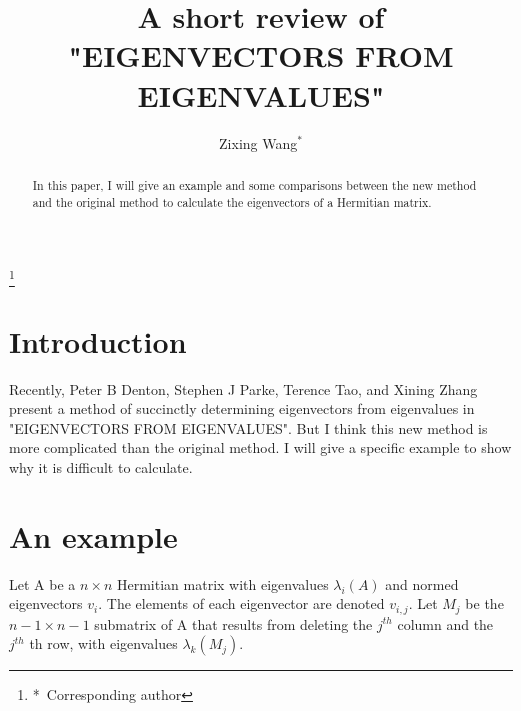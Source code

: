 \documentclass{amsart}
\theoremstyle{definition}
\theoremstyle{remark}
\numberwithin{equation}{section}
\begin{document}
	
	\title{A short review of "EIGENVECTORS FROM EIGENVALUES"}
	\date{}


\author{Zixing Wang$^*$}


\address{School of Mathematical Sciences, Shanghai Jiao Tong University,
800 Dongchuan Road, 200240 Shanghai, China}

\thanks{ *\ Corresponding author}



\date{}

\dedicatory{}



\begin{abstract}


In this paper, I will give an example and some comparisons between the new method and the original method to calculate the eigenvectors of a Hermitian matrix.

\end{abstract}

\maketitle


    \section{Introduction}

Recently, Peter B Denton, Stephen J Parke, Terence Tao, and Xining Zhang present a method of succinctly determining eigenvectors from eigenvalues in "EIGENVECTORS FROM EIGENVALUES". But I think this new method is more complicated than the original method. I will give a specific example to show why it is difficult to calculate.

    \section{An example}
Let A be a $n \times n $ Hermitian matrix with eigenvalues $\lambda _i \left(A \right)$ and normed eigenvectors $v_i$. The elements of each eigenvector are denoted $v_{i,j}$. Let $M_j$ be the
$n-1 \times n-1 $ submatrix of A that results from deleting the $j^{th}$ column and the $j^{th}$ th
row, with eigenvalues $\lambda _k\left( M_{j} \right)$.
\end{document}
